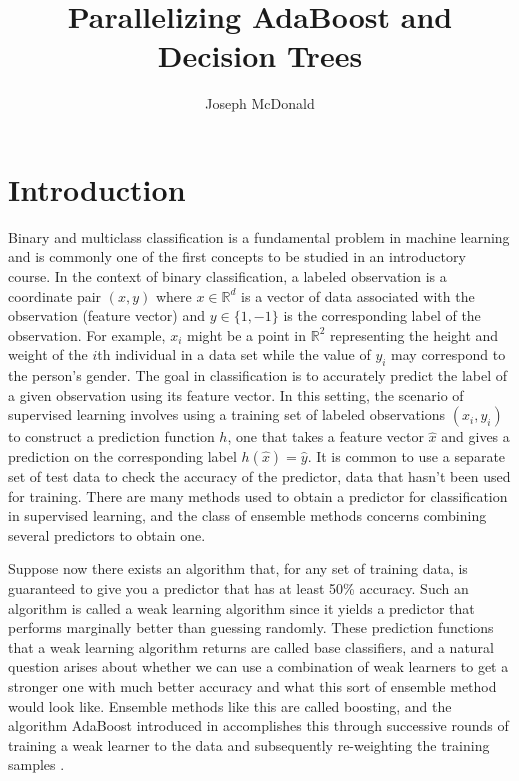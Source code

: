 \documentclass[12pt]{article}
\author{Joseph McDonald}
\title{Parallelizing AdaBoost and Decision Trees}
\begin{document}

\maketitle

\section{Introduction} Binary and multiclass classification is a fundamental
problem in machine learning and is commonly one of the first concepts to be
studied in an introductory course. In the context of binary classification, a
labeled observation is a coordinate pair $(x, y)$ where $x\in\mathbb{R}^d$ is a
vector of data associated with the observation (feature vector) and $y\in\{1,
-1\}$ is the corresponding label of the observation. For example, $x_i$ might
be a point in $\mathbb{R}^2$ representing the height and weight of the $i$th
individual in a data set while the value of $y_i$ may correspond to the
person's gender. The goal in classification is to accurately predict the label
of a given observation using its feature vector. In this setting, the scenario
of supervised learning involves using a training set of labeled observations
$(x_i, y_i)$ to construct a prediction function $h$, one that takes a feature
vector $\hat{x}$ and gives a prediction on the corresponding label
$h(\hat{x})=\hat{y}$. It is common to use a separate set of test data to check
the accuracy of the predictor, data that hasn't been used for training. There
are many methods used to obtain a predictor for classification in supervised
learning, and the class of ensemble methods concerns combining several
predictors to obtain one.

Suppose now there exists an algorithm that, for any set of training data, is
guaranteed to give you a predictor that has at least 50\% accuracy. Such an
algorithm is called a weak learning algorithm since it yields a predictor that
performs marginally better than guessing randomly. These prediction functions
that a weak learning algorithm returns are called base classifiers, and a
natural question arises about whether we can use a combination of weak learners
to get a stronger one with much better accuracy and what this sort of ensemble
method would look like. Ensemble methods like this are called boosting, and the
algorithm AdaBoost introduced in \cite{no1} accomplishes this through
successive rounds of training a weak learner to the data and subsequently
re-weighting the training samples \cite{no1}.
\end{document}

